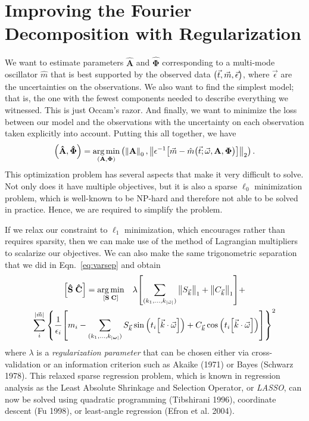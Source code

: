 \documentclass[11pt,twoside]{book}
\begin{document}
\section{Improving the Fourier Decomposition with Regularization}
We want to estimate parameters $\mathbf {\hat A}$ and $\boldsymbol{\hat \Phi}$ corresponding to a multi-mode oscillator $\hat m$ that is best supported by the observed data $\qty(\vec t, \vec m, \vec \epsilon)$, where $\vec \epsilon$ are the uncertainties on the observations. We also want to find the simplest model; that is, the one with the fewest components needed to describe everything we witnessed. This is just Occam's razor. And finally, we want to minimize the loss between our model and the observations with the uncertainty on each observation taken explicitly into account. Putting this all together, we have
\begin{equation}
    \qty(\mathbf {\hat A}, \boldsymbol{\hat \Phi}) =
      \underset{\qty(\mathbf A, \boldsymbol \Phi)}{\arg\min} 
      \left(\left\|\mathbf{A} \right\|_0,
            \left\| \epsilon^{-1}\qty[\vec m - \hat m\qty(\vec t ; {\vec \omega}, \mathbf{A}, \boldsymbol{\Phi})]\right\|_2
      \right). 
\end{equation}
This optimization problem has several aspects that make it very difficult to solve. Not only does it have multiple objectives, but it is also a sparse $\ell_0$ minimization problem, which is well-known to be NP-hard and therefore not able to be solved in practice. Hence, we are required to simplify the problem. 

If we relax our constraint to $\ell_1$ minimization, which encourages rather than requires sparsity, then we can make use of the method of Lagrangian multipliers to scalarize our objectives. We can also make the same trigonometric separation that we did in Eqn.~\ref{eq:varsep} and obtain 
\begin{equation} \label{eq:lasso}
\begin{gathered}
    \qty[\mathbf {\hat S}\; \mathbf{\hat C}] = \underset{[\mathbf S\; \mathbf C]}{\arg\min} \quad \lambda \qty[ \sum_{(k_1, \dots, k_{|\vec{\omega}|})} \norm{S_{\vec{k}}}_1 + \norm{C_{\vec{k}}}_1 ] +
    \\\sum_i^{|\vec{m}|} \qty{\frac{1}{\epsilon_i}\qty[m_i - 
      \sum_{(k_1, \dots, k_{|\boldsymbol{\omega}|})} 
        S_{\vec{k}} \sin \qty(t_i\qty[\vec{k}\cdot\vec{\omega}]) 
       +C_{\vec{k}} \cos \qty(t_i\qty[\vec{k}\cdot\vec{\omega}])]
    }^2
\end{gathered}
\end{equation}
where $\lambda$ is a \emph{regularization parameter} that can be chosen either via cross-validation or an information criterion such as Akaike (1971) or Bayes (Schwarz 1978). This relaxed sparse regression problem, which is known in regression analysis as the Least Absolute Shrinkage and Selection Operator, or \emph{LASSO}, can now be solved using quadratic programming (Tibshirani 1996), coordinate descent (Fu 1998), or least-angle regression (Efron et al. 2004). 
\end{document}
